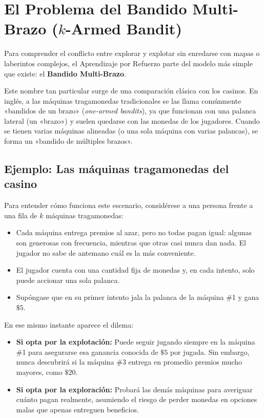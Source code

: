 \section{El Problema del Bandido Multi-Brazo ($k$-Armed Bandit)}
Para comprender el conflicto entre explorar y explotar sin enredarse con mapas o laberintos complejos, el Aprendizaje por Refuerzo parte del modelo más simple que existe: el \textbf{Bandido Multi-Brazo}.

Este nombre tan particular surge de una comparación clásica con los casinos. En inglés, a las máquinas tragamonedas tradicionales se las llama comúnmente «bandidos de un brazo» (\textit{one-armed bandits}), ya que funcionan con una palanca lateral (un «brazo») y suelen quedarse con las monedas de los jugadores. Cuando se tienen varias máquinas alineadas (o una sola máquina con varias palancas), se forma un «bandido de múltiples brazos».

\subsection*{Ejemplo: Las máquinas tragamonedas del casino}
Para entender cómo funciona este escenario, considérese a una persona frente a una fila de $k$ máquinas tragamonedas:
\begin{itemize}
  \item Cada máquina entrega premios al azar, pero no todas pagan igual: algunas son generosas con frecuencia, mientras que otras casi nunca dan nada. El jugador no sabe de antemano cuál es la más conveniente.
  \item El jugador cuenta con una cantidad fija de monedas y, en cada intento, solo puede accionar una sola palanca.
  \item Supóngase que en su primer intento jala la palanca de la máquina \#1 y gana $\$5$.
\end{itemize}

En ese mismo instante aparece el dilema:
\begin{itemize}
  \item \textbf{Si opta por la explotación:} Puede seguir jugando siempre en la máquina \#1 para asegurarse esa ganancia conocida de $\$5$ por jugada. Sin embargo, nunca descubrirá si la máquina \#3 entrega en promedio premios mucho mayores, como $\$20$.
  \item \textbf{Si opta por la exploración:} Probará las demás máquinas para averiguar cuánto pagan realmente, asumiendo el riesgo de perder monedas en opciones malas que apenas entreguen beneficios.
\end{itemize}

